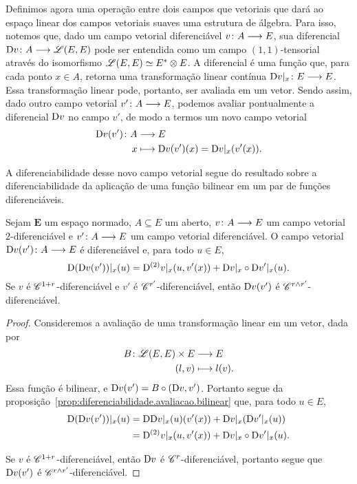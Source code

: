 Definimos agora uma operação entre dois campos que vetoriais que dará ao espaço linear dos campos vetoriais suaves uma estrutura de álgebra. Para isso, notemos que, dado um campo vetorial diferenciável $v\colon \allowbreak A \longrightarrow E$, sua diferencial $\mathrm{D} v\colon \allowbreak A \longrightarrow \mathscr{L}(E,E)$ pode ser entendida como um campo $(1,1)$-tensorial através do isomorfismo $\mathscr{L}(E,E) \simeq E^{\ast} \otimes E$. A diferencial é uma função que, para cada ponto $x \in A$, retorna uma transformação linear contínua $\mathrm{D} v|_x\colon \allowbreak E \longrightarrow E$. Essa transformação linear pode, portanto, ser avaliada em um vetor. Sendo assim, dado outro campo vetorial $v'\colon \allowbreak A \longrightarrow E$, podemos avaliar pontualmente a diferencial $\mathrm{D} v$ no campo $v'$, de modo a termos um novo campo vetorial
	\begin{align*}
	{\mathrm{D}v(v')}\colon {A} &\longrightarrow {E} \\{x} &\longmapsto \mathrm{D} v(v')(x) = \mathrm{D} v|_x (v'(x)).
	\end{align*}

A diferenciabilidade desse novo campo vetorial segue do resultado sobre a diferenciabilidade da aplicação de uma função bilinear em um par de funções diferenciáveis.

\begin{proposition}
\label{prop:diferenciabilidade.contracao.tensor.vetor}
Sejam $\bm E$ um espaço normado, $A \subseteq E$ um aberto, $v\colon \allowbreak A \longrightarrow E$ um campo vetorial $2$-diferenciável e $v'\colon \allowbreak A \longrightarrow E$ um campo vetorial diferenciável. O campo vetorial $\mathrm{D} v(v')\colon \allowbreak A \longrightarrow E$ é diferenciável e, para todo $u \in E$,
	\begin{equation*}
	\mathrm{D} (\mathrm{D} v(v'))|_x(u) = \mathrm{D}^{(2)} v|_x(u, v'(x)) + \mathrm{D} v|_x \circ \mathrm{D} v'|_x(u).
	\end{equation*}
Se $v$ é $\mathscr{C}^{1+r}$-diferenciável e $v'$ é $\mathscr{C}^{r'}$-diferenciável, então $\mathrm{D} v(v')$ é $\mathscr{C}^{r \mathbin{\wedge} r'}$-diferenciável.
\end{proposition}
\begin{proof}
Consideremos a avaliação de uma transformação linear em um vetor, dada por
	\begin{align*}
	{B}\colon {\mathscr{L}(E,E) \times E} &\longrightarrow {E} \\{(l,v)} &\longmapsto l(v).
	\end{align*}
Essa função é bilinear, e $\mathrm{D} v(v') = B \circ (\mathrm{D} v, v')$. Portanto segue da proposição~\ref{prop:diferenciabilidade.avaliacao.bilinear} que, para todo $u \in E$,
	\begin{align*}
	\mathrm{D} (\mathrm{D} v(v'))|_x(u) &= \mathrm{D} \mathrm{D} v|_x(u)(v'(x)) + \mathrm{D} v|_x(\mathrm{D} v'|_x(u)) \\
	&= \mathrm{D}^{(2)} v|_x(u, v'(x)) + \mathrm{D} v|_x \circ \mathrm{D} v'|_x(u).
	\end{align*}

Se $v$ é $\mathscr{C}^{1+r}$-diferenciável, então $\mathrm{D} v$ é $\mathscr{C}^r$-diferenciável, portanto segue que $\mathrm{D} v(v')$ é $\mathscr{C}^{r \mathbin{\wedge} r'}$-diferenciável.
\end{proof}

